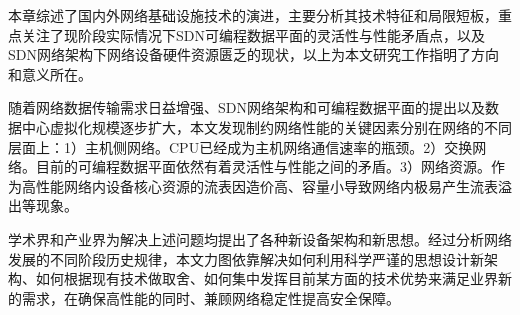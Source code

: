 

















\label{chap25}

本章综述了国内外网络基础设施技术的演进，主要分析其技术特征和局限短板，重点关注了现阶段实际情况下SDN可编程数据平面的灵活性与性能矛盾点，以及SDN网络架构下网络设备硬件资源匮乏的现状，以上为本文研究工作指明了方向和意义所在。

随着网络数据传输需求日益增强、SDN网络架构和可编程数据平面的提出以及数据中心虚拟化规模逐步扩大，本文发现制约网络性能的关键因素分别在网络的不同层面上：1）主机侧网络。CPU已经成为主机网络通信速率的瓶颈。2）交换网络。目前的可编程数据平面依然有着灵活性与性能之间的矛盾。3）网络资源。作为高性能网络内设备核心资源的流表因造价高、容量小导致网络内极易产生流表溢出等现象。

学术界和产业界为解决上述问题均提出了各种新设备架构和新思想。经过分析网络发展的不同阶段历史规律，本文力图依靠解决如何利用科学严谨的思想设计新架构、如何根据现有技术做取舍、如何集中发挥目前某方面的技术优势来满足业界新的需求，在确保高性能的同时、兼顾网络稳定性提高安全保障。












































